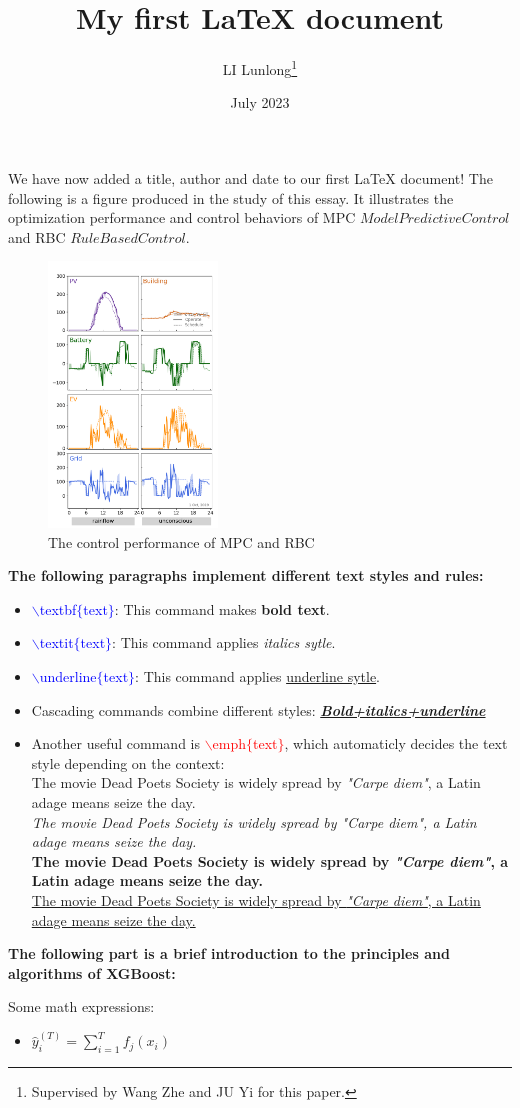\documentclass[10pt]{article}
\title{My first LaTeX document}
\author{LI Lunlong\thanks{Supervised by Wang Zhe and JU Yi for this paper.}}
\date{July 2023} %
\begin{document}
\maketitle
We have now added a title, author and date to our first \LaTeX{} document!
The following is a figure produced in the study of this essay. 
It illustrates the optimization performance and control behaviors of MPC \(Model Predictive Control\)
and RBC \(Rule Based Control\).
\begin{figure}[h] %
    \centering
    \includegraphics[width=0.4\textwidth]{case1}
    \caption[short]{The control performance of MPC and RBC}
    \label{fig:case1}
\end{figure}

\textbf{The following paragraphs implement different text styles and rules:}
\begin{itemize}
    \item \textcolor{blue}{$\backslash$textbf$\{$text$\}$}: This command makes \textbf{bold text}.
    \item \textcolor{blue}{$\backslash$textit$\{$text$\}$}: This command applies \textit{italics sytle}.
    \item \textcolor{blue}{$\backslash$underline$\{$text$\}$}: This command applies \underline{underline sytle}.
    \item Cascading commands combine different styles: \textbf{\textit{\underline{Bold+italics+underline}}}
    \item Another useful command is \textcolor{red}{$\backslash$emph$\{$text$\}$}, which automaticly decides the text style depending on the context: \\
          The movie Dead Poets Society is widely spread by \emph{"Carpe diem"}, a Latin adage means seize the day.\\
          \textit{The movie Dead Poets Society is widely spread by \emph{"Carpe diem"}, a Latin adage means seize the day.}\\
          \textbf{The movie Dead Poets Society is widely spread by \emph{"Carpe diem"}, a Latin adage means seize the day.}\\
          \underline{The movie Dead Poets Society is widely spread by \emph{"Carpe diem"}, a Latin adage means seize the day.}\\
\end{itemize}

\textbf{ The following part is a brief introduction to the principles and algorithms of XGBoost:}

Some math expressions:
\begin{itemize}
  \item $\hat{y}_i^{(T)}=\sum_{i=1}^{T} f_j(x_i)$
\end{itemize}
\end{document}
